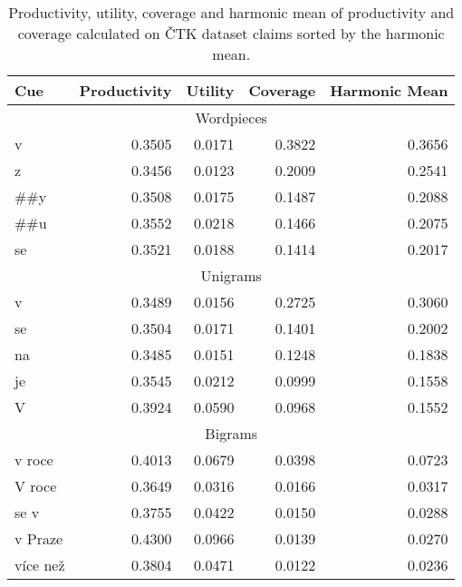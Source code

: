     
    \begin{table}[ht] \label{table:claim-quality-ctk-prod-cov}
        \centering
        \begin{tabular}{lrrrr}
            \toprule
            {Cue} &  Productivity &  Utility &  Coverage &  Harmonic Mean \\
            \midrule
            \multicolumn{5}{c}{Wordpieces} \\
            v   &        0.3505 &   0.0171 &    0.3822 &         0.3656 \\
            z   &        0.3456 &   0.0123 &    0.2009 &         0.2541 \\
            \#\#y &        0.3508 &   0.0175 &    0.1487 &         0.2088 \\
            \#\#u &        0.3552 &   0.0218 &    0.1466 &         0.2075 \\
            se  &        0.3521 &   0.0188 &    0.1414 &         0.2017 \\
            \midrule
            \multicolumn{5}{c}{Unigrams} \\
            v       &    0.3489  & 0.0156  &  0.2725    &     0.3060 \\
            se      &    0.3504  & 0.0171  &  0.1401    &     0.2002 \\
            na      &    0.3485  & 0.0151  &  0.1248    &     0.1838 \\
            je      &    0.3545  & 0.0212  &  0.0999    &     0.1558 \\
            V       &    0.3924  & 0.0590  &  0.0968    &     0.1552 \\
            \midrule
            \multicolumn{5}{c}{Bigrams} \\
            v roce             &        0.4013 &   0.0679 &    0.0398 &         0.0723 \\
            V roce             &        0.3649 &   0.0316 &    0.0166 &         0.0317 \\
            se v               &        0.3755 &   0.0422 &    0.0150 &         0.0288 \\
            v Praze            &        0.4300 &   0.0966 &    0.0139 &         0.0270 \\
            více než           &        0.3804 &   0.0471 &    0.0122 &         0.0236 \\
            \bottomrule
        \end{tabular}
        \caption[Productivity, utility, coverage and harmonic mean of productivity and coverage on ČTK]{Productivity, utility, coverage and harmonic mean of productivity and coverage calculated on ČTK dataset claims sorted by the harmonic mean.}
    \end{table}



